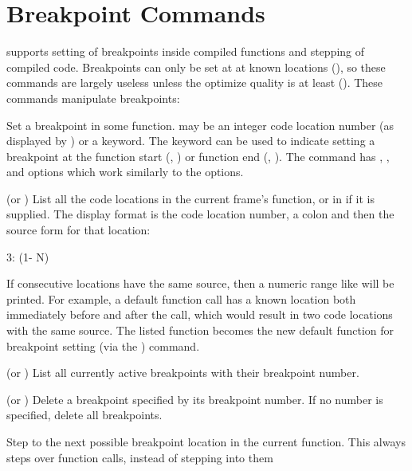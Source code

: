 \section{Breakpoint Commands}

\cmucl{} supports setting of breakpoints inside compiled functions and
stepping of compiled code.  Breakpoints can only be set at at known
locations (), so these commands are largely
useless unless the  optimize quality is at least 
().  These commands manipulate breakpoints:
\begin{Lentry}
\item[\code{breakpoint} \var{location} \mstar{\var{option} \var{value}}]
Set a breakpoint in some function.   may be an integer
code location number (as displayed by ) or a
keyword.  The keyword can be used to indicate setting a breakpoint at
the function start (, ) or function end
(, ).  The  command has
, ,  and 
options which work similarly to the  options.

\item[\code{list-locations} (or \code{ll}) \mopt{\var{function}}]%
List all the code locations in the current frame's function, or in
 if it is supplied.  The display format is the code
location number, a colon and then the source form for that location:
\begin{example}
3: (1- N)
\end{example}
If consecutive locations have the same source, then a numeric range like
 will be printed.  For example, a default function call has a
known location both immediately before and after the call, which would
result in two code locations with the same source.  The listed function
becomes the new default function for breakpoint setting (via the
) command.

\item[\code{list-breakpoints} (or \code{lb})]%
List all currently active breakpoints with their breakpoint number.

\item[\code{delete-breakpoint} (or \code{db}) \mopt{\var{number}}]%
Delete a breakpoint specified by its breakpoint number.  If no number is
specified, delete all breakpoints.

\item[\code{step}]%
Step to the next possible breakpoint location in the current function.
This always steps over function calls, instead of stepping into them
\end{Lentry}


